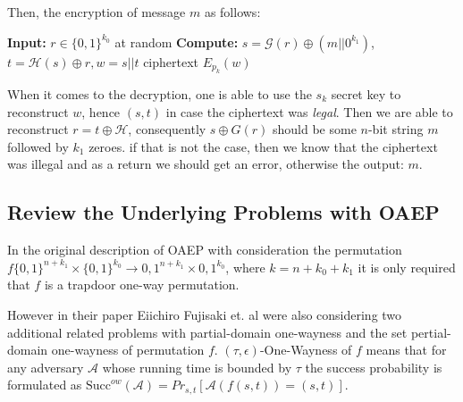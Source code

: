 \documentclass[10pt,a4paper]{article}
\begin{document}
Then, the encryption of message $m$ as follows:

\begin{algorithm}
\caption{OAEP-based Encryption (Overview)}
\begin{algorithmic}[1]
\State \textbf{Input:} \(r \in \{0,1\}^{k_0} \) at random
\State \textbf{Compute:} \(s = \mathcal{G}(r) \oplus (m || 0^{k_1}) \), 
                         \( t = \mathcal{H}(s) \oplus r, w = s||t \)
\State \Return  ciphertext \( E_{p_k}(w) \)
\end{algorithmic}
\end{algorithm}

When it comes to the decryption, one is able to use the $s_k$ secret key to reconstruct $w$, hence $(s,t)$ in case the ciphertext was \textit{legal}. Then we are able to reconstruct $r=t \oplus \mathcal{H}$, consequently $s \oplus G(r)$ should be some $n$-bit string $m$ followed by $k_1$ zeroes.
if that is not the case, then we know that the ciphertext was illegal and as a return we should get an error, otherwise the output: $m$. \cite{Damgaard2025} 


\subsection{Review the Underlying Problems with OAEP}


In the original description of OAEP \cite{Bellare1995} with consideration the permutation $f \{0,1\}^{n+k_1} \times \{0,1\}^{k_0} \rightarrow {0,1}^{n+k_1} \times {0,1}^{k_0}$, where $k = n+k_0 + k_1$ it is only required that $f$ is a trapdoor one-way permutation.

However in their paper  \cite{Kilian2001} Eiichiro Fujisaki et. al were also considering two additional related problems with partial-domain one-wayness and the set pertial-domain one-wayness of permutation $f$. $(\tau, \epsilon)$-One-Wayness of $f$ means that for any adversary $\mathcal{A}$ whose running time is bounded by $\tau$ the success probability is formulated as $\mathrm{Succ}^{ow}(\mathcal{A}) = Pr_{s,t} \left[ \mathcal{A}(f(s,t)) = (s,t) \right] $.
\end{document}
